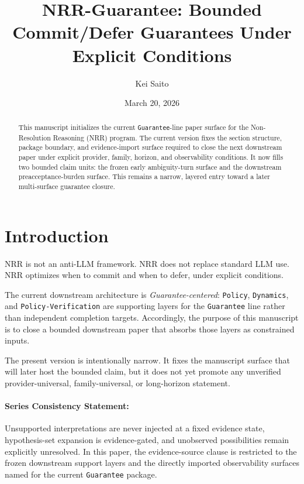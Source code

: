 \documentclass[11pt]{article}
\title{NRR-Guarantee: Bounded Commit/Defer Guarantees Under Explicit Conditions}
\author{Kei Saito}
\date{March 20, 2026}
\begin{document}
\maketitle

\begin{abstract}
This manuscript initializes the current \texttt{Guarantee}-line paper surface for
the Non-Resolution Reasoning (NRR) program. The current version fixes the section
structure, package boundary, and evidence-import surface required to close the next
downstream paper under explicit provider, family, horizon, and observability
conditions. It now fills two bounded claim units: the frozen early ambiguity-turn
surface and the downstream preacceptance-burden surface. This remains a narrow,
layered entry toward a later multi-surface guarantee closure.
\end{abstract}

\section{Introduction}

NRR is not an anti-LLM framework. NRR does not replace standard LLM use. NRR
optimizes when to commit and when to defer, under explicit conditions.

The current downstream architecture is \textit{Guarantee-centered}: \texttt{Policy},
\texttt{Dynamics}, and \texttt{Policy-Verification} are supporting layers for the
\texttt{Guarantee} line rather than independent completion targets. Accordingly, the
purpose of this manuscript is to close a bounded downstream paper that absorbs those
layers as constrained inputs.

The present version is intentionally narrow. It fixes the manuscript surface that
will later host the bounded claim, but it does not yet promote any unverified
provider-universal, family-universal, or long-horizon statement.

\paragraph{Series Consistency Statement:}
Unsupported interpretations are never injected at a fixed evidence state,
hypothesis-set expansion is evidence-gated, and unobserved possibilities remain
explicitly unresolved. In this paper, the evidence-source clause is restricted to
the frozen downstream support layers and the directly imported observability
surfaces named for the current \texttt{Guarantee} package.
\end{document}
